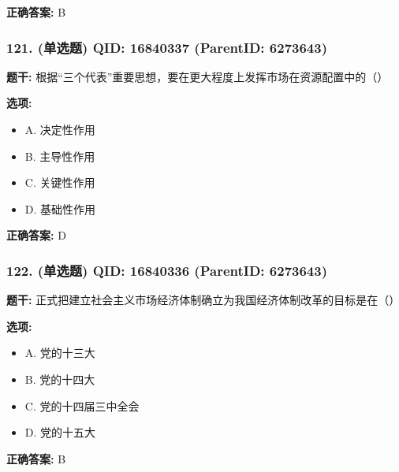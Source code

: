 \documentclass[12pt,UTF8]{ctexart}
\begin{document}
\textbf{正确答案:}
B

\vspace{0.3em}\hrulefill\vspace{0.7em}

\subsubsection*{121. (单选题) \small QID: 16840337 (ParentID: 6273643)}

\textbf{题干:}
根据“三个代表”重要思想，要在更大程度上发挥市场在资源配置中的（）



\textbf{选项:}
\begin{itemize}[leftmargin=*]

  \item A. 决定性作用

  \item B. 主导性作用

  \item C. 关键性作用

  \item D. 基础性作用

\end{itemize}

\textbf{正确答案:}
D

\vspace{0.3em}\hrulefill\vspace{0.7em}

\subsubsection*{122. (单选题) \small QID: 16840336 (ParentID: 6273643)}

\textbf{题干:}
正式把建立社会主义市场经济体制确立为我国经济体制改革的目标是在（）



\textbf{选项:}
\begin{itemize}[leftmargin=*]

  \item A. 党的十三大

  \item B. 党的十四大

  \item C. 党的十四届三中全会

  \item D. 党的十五大

\end{itemize}

\textbf{正确答案:}
B
\end{document}
